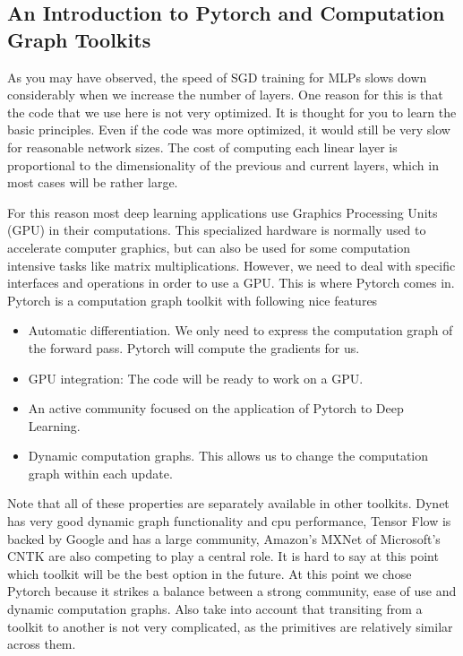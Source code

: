 \subsection{An Introduction to Pytorch and Computation Graph Toolkits}

As you may have observed, the speed of SGD training for MLPs slows down
considerably when we increase the number of layers. One reason for this is that
the code that we use here is not very optimized. It is thought for you to
learn the basic principles. Even if the code was more optimized, it would still be
very slow for reasonable network sizes. The cost of computing each
linear layer is proportional to the dimensionality of the previous and current
layers, which in most cases will be rather large.

For this reason most deep learning applications use Graphics Processing Units
(GPU) in their computations. This specialized hardware is normally used to
accelerate computer graphics, but can also be used for some computation
intensive tasks like matrix multiplications. However, we need to deal with
specific interfaces and operations in order to use a GPU. This is where Pytorch
comes in. Pytorch is a computation graph toolkit with following nice features

\begin{itemize}
\item Automatic differentiation. We only need to express the computation graph of the forward pass. Pytorch will compute the gradients for us. 
\item GPU integration: The code will be ready to work on a GPU.
\item An active community focused on the application of Pytorch to Deep Learning.
\item Dynamic computation graphs. This allows us to change the computation graph within each update. 
\end{itemize}

Note that all of these properties are separately available in other toolkits. Dynet
has very good dynamic graph functionality and cpu performance, Tensor Flow is
backed by Google and has a large community, Amazon's MXNet of Microsoft's CNTK
are also competing to play a central role. It is hard to say at this point
which toolkit will be the best option in the future. At this point we chose Pytorch 
because it strikes a balance between a strong community, ease of use and
dynamic computation graphs. Also take into account that transiting from a
toolkit to another is not very complicated, as the primitives are relatively
similar across them.

